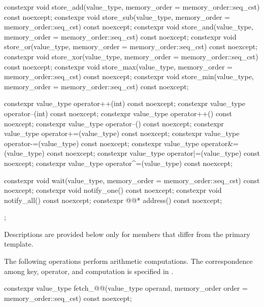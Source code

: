 \begin{codeblock}
{{    constexpr void store_add(value_type,
                             memory_order = memory_order::seq_cst) const noexcept;
    constexpr void store_sub(value_type,
                             memory_order = memory_order::seq_cst) const noexcept;
    constexpr void store_and(value_type,
                             memory_order = memory_order::seq_cst) const noexcept;
    constexpr void store_or(value_type,
                            memory_order = memory_order::seq_cst) const noexcept;
    constexpr void store_xor(value_type,
                             memory_order = memory_order::seq_cst) const noexcept;
    constexpr void store_max(value_type,
                             memory_order = memory_order::seq_cst) const noexcept;
    constexpr void store_min(value_type,
                             memory_order = memory_order::seq_cst) const noexcept;

    constexpr value_type operator++(int) const noexcept;
    constexpr value_type operator--(int) const noexcept;
    constexpr value_type operator++() const noexcept;
    constexpr value_type operator--() const noexcept;
    constexpr value_type operator+=(value_type) const noexcept;
    constexpr value_type operator-=(value_type) const noexcept;
    constexpr value_type operator&=(value_type) const noexcept;
    constexpr value_type operator|=(value_type) const noexcept;
    constexpr value_type operator^=(value_type) const noexcept;

    constexpr void wait(value_type, memory_order = memory_order::seq_cst) const noexcept;
    constexpr void notify_one() const noexcept;
    constexpr void notify_all() const noexcept;
    constexpr @@* address() const noexcept;
  };
}
\end{codeblock}

\pnum
Descriptions are provided below only for members
that differ from the primary template.

\pnum
The following operations perform arithmetic computations.
The correspondence among key, operator, and computation is specified
in .

%
%
%
%
%
%
%
\begin{itemdecl}
constexpr value_type fetch_@@(value_type operand,
  memory_order order = memory_order::seq_cst) const noexcept;
\end{itemdecl}

